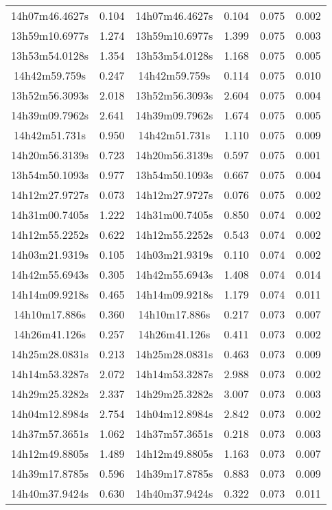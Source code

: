 \begin{table}
\begin{tabular}{cccccc}
14h07m46.4627s & 0.104 & 14h07m46.4627s & 0.104 & 0.075 & 0.002 \\
13h59m10.6977s & 1.274 & 13h59m10.6977s & 1.399 & 0.075 & 0.003 \\
13h53m54.0128s & 1.354 & 13h53m54.0128s & 1.168 & 0.075 & 0.005 \\
14h42m59.759s & 0.247 & 14h42m59.759s & 0.114 & 0.075 & 0.010 \\
13h52m56.3093s & 2.018 & 13h52m56.3093s & 2.604 & 0.075 & 0.004 \\
14h39m09.7962s & 2.641 & 14h39m09.7962s & 1.674 & 0.075 & 0.005 \\
14h42m51.731s & 0.950 & 14h42m51.731s & 1.110 & 0.075 & 0.009 \\
14h20m56.3139s & 0.723 & 14h20m56.3139s & 0.597 & 0.075 & 0.001 \\
13h54m50.1093s & 0.977 & 13h54m50.1093s & 0.667 & 0.075 & 0.004 \\
14h12m27.9727s & 0.073 & 14h12m27.9727s & 0.076 & 0.075 & 0.002 \\
14h31m00.7405s & 1.222 & 14h31m00.7405s & 0.850 & 0.074 & 0.002 \\
14h12m55.2252s & 0.622 & 14h12m55.2252s & 0.543 & 0.074 & 0.002 \\
14h03m21.9319s & 0.105 & 14h03m21.9319s & 0.110 & 0.074 & 0.002 \\
14h42m55.6943s & 0.305 & 14h42m55.6943s & 1.408 & 0.074 & 0.014 \\
14h14m09.9218s & 0.465 & 14h14m09.9218s & 1.179 & 0.074 & 0.011 \\
14h10m17.886s & 0.360 & 14h10m17.886s & 0.217 & 0.073 & 0.007 \\
14h26m41.126s & 0.257 & 14h26m41.126s & 0.411 & 0.073 & 0.002 \\
14h25m28.0831s & 0.213 & 14h25m28.0831s & 0.463 & 0.073 & 0.009 \\
14h14m53.3287s & 2.072 & 14h14m53.3287s & 2.988 & 0.073 & 0.002 \\
14h29m25.3282s & 2.337 & 14h29m25.3282s & 3.007 & 0.073 & 0.003 \\
14h04m12.8984s & 2.754 & 14h04m12.8984s & 2.842 & 0.073 & 0.002 \\
14h37m57.3651s & 1.062 & 14h37m57.3651s & 0.218 & 0.073 & 0.003 \\
14h12m49.8805s & 1.489 & 14h12m49.8805s & 1.163 & 0.073 & 0.007 \\
14h39m17.8785s & 0.596 & 14h39m17.8785s & 0.883 & 0.073 & 0.009 \\
14h40m37.9424s & 0.630 & 14h40m37.9424s & 0.322 & 0.073 & 0.011 \\

\end{tabular}
\end{table}
